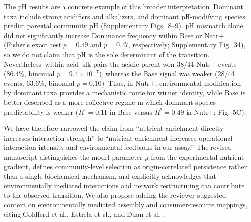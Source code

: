 The pH results are a concrete example of this broader interpretation. Dominant taxa include strong acidifiers and alkalizers, and dominant pH-modifying species predict parental community pH (Supplementary Figs.~8--9). pH mismatch alone did not significantly increase Dominance frequency within Base or Nutr$+$ (Fisher's exact test $p = 0.49$ and $p = 0.47$, respectively; Supplementary Fig.~34), so we do not claim that pH is the sole determinant of the transition. Nevertheless, within acid--alk pairs the acidic parent won 38/44 Nutr$+$ events (86.4\%, binomial $p = 9.4 \times 10^{-7}$), whereas the Base signal was weaker (28/44 events, 63.6\%, binomial $p = 0.10$). Thus, in Nutr$+$, environmental modification by dominant taxa provides a mechanistic route for winner identity, while Base is better described as a more collective regime in which dominant-species predictability is weaker ($R^2 = 0.11$ in Base versus $R^2 = 0.49$ in Nutr$+$; Fig.~5C).

We have therefore narrowed the claim from ``nutrient enrichment directly increases interaction strength'' to ``nutrient enrichment increases operational interaction intensity and environmental feedbacks in our assay.'' The revised manuscript distinguishes the model parameter $\mu$ from the experimental nutrient gradient, defines community-level selection as origin-correlated persistence rather than a single biochemical mechanism, and explicitly acknowledges that environmentally mediated interactions and network restructuring can contribute to the observed transition. We also propose adding the reviewer-suggested context on environmentally mediated assembly and consumer-resource mappings, citing Goldford et al., Estrela et al., and Duan et al. \citep{Goldford2018,Estrela2021,DuanPawar2025}.

